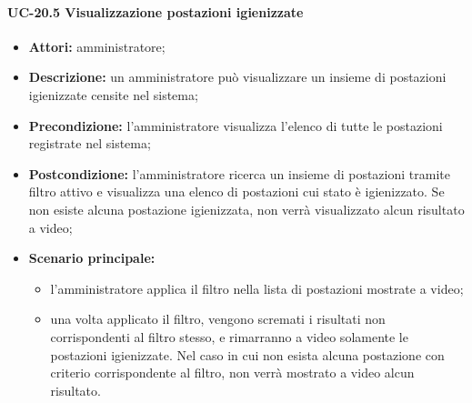 \paragraph{UC-20.5 Visualizzazione postazioni igienizzate}
\begin{itemize}
    \item \textbf{Attori:} amministratore;
    \item \textbf{Descrizione:} un amministratore pu\`{o} visualizzare un insieme di postazioni igienizzate censite nel sistema;
    \item \textbf{Precondizione:} l'amministratore visualizza l'elenco di tutte le postazioni registrate nel sistema;
    \item \textbf{Postcondizione:} l'amministratore ricerca un insieme di postazioni tramite filtro attivo e visualizza una elenco di postazioni cui stato è igienizzato. Se non esiste alcuna postazione igienizzata, non verrà visualizzato alcun risultato a video;
    \item \textbf{Scenario principale:}
    \begin{itemize}
        \item l'amministratore applica il filtro nella lista di postazioni mostrate a video;
        \item una volta applicato il filtro, vengono scremati i risultati non corrispondenti al filtro stesso, e rimarranno a video solamente le postazioni igienizzate. Nel caso in cui non esista alcuna postazione con criterio corrispondente al filtro, non verrà mostrato a video alcun risultato.
    \end{itemize}
\end{itemize}

